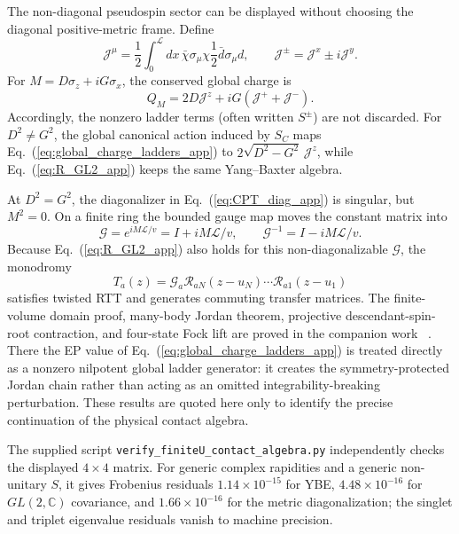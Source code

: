 \documentclass[%
  aps,prb,reprint,amsmath,amssymb,superscriptaddress,longbibliography,floatfix
]{revtex4-2}
\begin{document}
The non-diagonal pseudospin sector can be displayed without choosing
the diagonal positive-metric frame.  Define
\begin{equation}
\mathcal J^\mu
=\frac12\int_0^{\mathcal L}dx\,\bar\chi\sigma_\mu\chi
 \frac12\bar d\sigma_\mu d,\qquad
\mathcal J^\pm=\mathcal J^x\pm i\mathcal J^y .
\label{eq:global_ladders_app}
\end{equation}
For \(M=D\sigma_z+iG\sigma_x\), the conserved global charge is
\begin{equation}
Q_M
=2D\mathcal J^z+iG(\mathcal J^++\mathcal J^-).
\label{eq:global_charge_ladders_app}
\end{equation}
Accordingly, the nonzero ladder terms (often written \(S^\pm\)) are
not discarded.  For \(D^2\ne G^2\), the global canonical action
induced by \(S_C\) maps Eq.~(\ref{eq:global_charge_ladders_app}) to
\(2\sqrt{D^2-G^2}\,\mathcal J^z\), while
Eq.~(\ref{eq:R_GL2_app}) keeps the same Yang--Baxter algebra.

At \(D^2=G^2\), the diagonalizer in Eq.~(\ref{eq:CPT_diag_app}) is singular,
but \(M^2=0\).  On a finite ring the bounded gauge map moves the constant
matrix into
\begin{equation}
\mathcal G=e^{iM\mathcal L/v}=I+iM\mathcal L/v,
\qquad \mathcal G^{-1}=I-iM\mathcal L/v .
\label{eq:unipotent_twist_app}
\end{equation}
Because Eq.~(\ref{eq:R_GL2_app}) also holds for this non-diagonalizable
\(\mathcal G\), the monodromy
\begin{equation}
T_a(z)=\mathcal G_a
\mathcal R_{aN}(z-u_N)\cdots\mathcal R_{a1}(z-u_1)
\label{eq:twisted_monodromy_app}
\end{equation}
satisfies twisted RTT and generates commuting transfer matrices.  The
finite-volume domain proof, many-body Jordan theorem, projective
descendant-spin-root contraction, and four-state Fock lift are proved in the companion work
~\cite{KulkarniYB2026}.  There the EP value of
Eq.~(\ref{eq:global_charge_ladders_app}) is treated directly as a
nonzero nilpotent global ladder generator: it creates the
symmetry-protected Jordan chain rather than acting as an omitted
integrability-breaking perturbation.  These results are quoted here only to
identify the precise continuation of the physical contact algebra.

The supplied script \nolinkurl{verify_finiteU_contact_algebra.py} independently
checks the displayed \(4\times4\) matrix.  For generic complex rapidities and
a generic non-unitary \(S\), it gives Frobenius residuals
\(1.14\times10^{-15}\) for YBE,
\(4.48\times10^{-16}\) for \(GL(2,\mathbb C)\) covariance, and
\(1.66\times10^{-16}\) for the metric diagonalization; the singlet and triplet
eigenvalue residuals vanish to machine precision.
\end{document}
